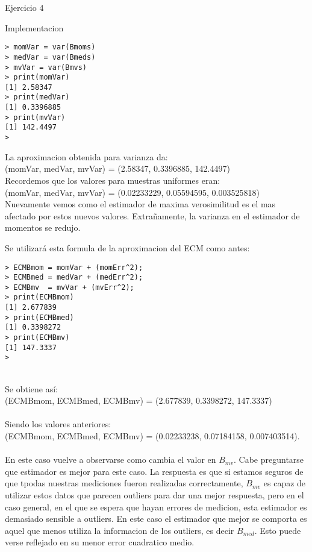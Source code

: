 \begin{section}{Ejercicio 4}
\begin{subsection}{Implementacion}
\begin{verbatim}
> momVar = var(Bmoms)
> medVar = var(Bmeds)
> mvVar = var(Bmvs)
> print(momVar)
[1] 2.58347
> print(medVar)
[1] 0.3396885
> print(mvVar)
[1] 142.4497
> 

\end{verbatim}

La aproximacion obtenida para varianza da: \\
(momVar, medVar, mvVar) = (2.58347, 0.3396885, 142.4497)\\
Recordemos que los valores para muestras uniformes eran:\\
(momVar, medVar, mvVar) = (0.02233229, 0.05594595, 0.003525818)\\
Nuevamente vemos como el estimador de maxima verosimilitud es el mas afectado por estos nuevos valores.
Extrañamente, la varianza en el estimador de momentos se redujo.



Se utilizará esta formula de la aproximacion del ECM como antes:

\begin{verbatim}
> ECMBmom = momVar + (momErr^2);
> ECMBmed = medVar + (medErr^2);
> ECMBmv  = mvVar + (mvErr^2);
> print(ECMBmom)
[1] 2.677839
> print(ECMBmed)
[1] 0.3398272
> print(ECMBmv)
[1] 147.3337
> 
\end{verbatim}
~\\
Se obtiene así:\\
(ECMBmom, ECMBmed, ECMBmv) = (2.677839, 0.3398272, 147.3337)\\
~\\
Siendo los valores anteriores:\\
 (ECMBmom, ECMBmed, ECMBmv) = (0.02233238, 0.07184158, 0.007403514).\\
 ~\\
En este caso vuelve a observarse como cambia el valor en $B_{mv}$. Cabe preguntarse que estimador es mejor para este caso.
La respuesta es que si estamos seguros de que tpodas nuestras mediciones fueron realizadas correctamente, $B_{mv}$ es capaz de utilizar estos datos que parecen outliers para dar una mejor respuesta, pero en el caso general, en el que se espera que hayan errores de medicion, esta estimador es demasiado sensible a outliers. En este caso el estimador que mejor se comporta es aquel que menos utiliza la informacion de los outliers, es decir $B_{med}$. Esto puede verse reflejado en su menor error cuadratico medio.

\end{subsection}
\end{section}